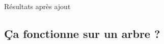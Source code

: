 \begin{frame}{Résultats après ajout}
\begin{figure}\centering
\end{figure}
\end{frame}

\subsection{Ça fonctionne sur un arbre ?}

